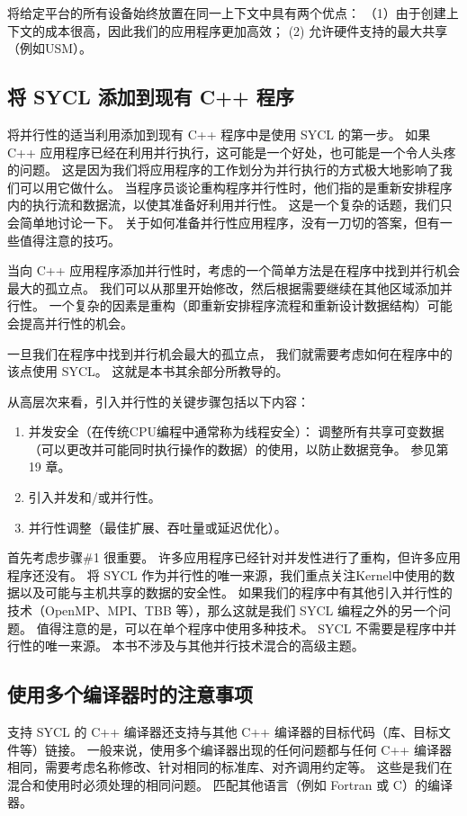 将给定平台的所有设备始终放置在同一上下文中具有两个优点：
（1）由于创建上下文的成本很高，因此我们的应用程序更加高效； (2) 允许硬件支持的最大共享（例如USM）。

\subsection{将 SYCL 添加到现有 C++ 程序}
将并行性的适当利用添加到现有 C++ 程序中是使用 SYCL 的第一步。 
如果 C++ 应用程序已经在利用并行执行，这可能是一个好处，也可能是一个令人头疼的问题。 
这是因为我们将应用程序的工作划分为并行执行的方式极大地影响了我们可以用它做什么。 
当程序员谈论重构程序并行性时，他们指的是重新安排程序内的执行流和数据流，以使其准备好利用并行性。 
这是一个复杂的话题，我们只会简单地讨论一下。 
关于如何准备并行性应用程序，没有一刀切的答案，但有一些值得注意的技巧。

当向 C++ 应用程序添加并行性时，考虑的一个简单方法是在程序中找到并行机会最大的孤立点。 
我们可以从那里开始修改，然后根据需要继续在其他区域添加并行性。 
一个复杂的因素是重构（即重新安排程序流程和重新设计数据结构）可能会提高并行性的机会。

一旦我们在程序中找到并行机会最大的孤立点，
我们就需要考虑如何在程序中的该点使用 SYCL。 这就是本书其余部分所教导的。

从高层次来看，引入并行性的关键步骤包括以下内容：

\begin{enumerate}
	\item 并发安全（在传统CPU编程中通常称为线程安全）：
	调整所有共享可变数据（可以更改并可能同时执行操作的数据）的使用，以防止数据竞争。 参见第 19 章。

	\item 引入并发和/或并行性。

	\item 并行性调整（最佳扩展、吞吐量或延迟优化）。
\end{enumerate}

首先考虑步骤\#1 很重要。 许多应用程序已经针对并发性进行了重构，但许多应用程序还没有。 
将 SYCL 作为并行性的唯一来源，我们重点关注Kernel中使用的数据以及可能与主机共享的数据的安全性。 
如果我们的程序中有其他引入并行性的技术（OpenMP、MPI、TBB 等），那么这就是我们 SYCL 编程之外的另一个问题。 
值得注意的是，可以在单个程序中使用多种技术。
SYCL 不需要是程序中并行性的唯一来源。 本书不涉及与其他并行技术混合的高级主题。

\subsection{使用多个编译器时的注意事项}
支持 SYCL 的 C++ 编译器还支持与其他 C++ 编译器的目标代码（库、目标文件等）链接。 
一般来说，使用多个编译器出现的任何问题都与任何 C++ 编译器相同，需要考虑名称修改、针对相同的标准库、对齐调用约定等。
这些是我们在混合和使用时必须处理的相同问题。 匹配其他语言（例如 Fortran 或 C）的编译器。

